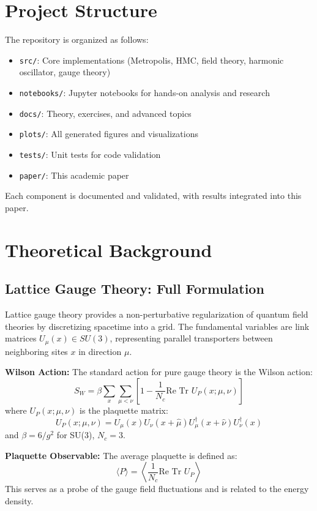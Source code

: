 \documentclass[12pt]{article}
\begin{document}
\section{Project Structure}
The repository is organized as follows:
\begin{itemize}
    \item \texttt{src/}: Core implementations (Metropolis, HMC, field theory, harmonic oscillator, gauge theory)
    \item \texttt{notebooks/}: Jupyter notebooks for hands-on analysis and research
    \item \texttt{docs/}: Theory, exercises, and advanced topics
    \item \texttt{plots/}: All generated figures and visualizations
    \item \texttt{tests/}: Unit tests for code validation
    \item \texttt{paper/}: This academic paper
\end{itemize}
Each component is documented and validated, with results integrated into this paper.

\section{Theoretical Background}
\subsection{Lattice Gauge Theory: Full Formulation}
Lattice gauge theory provides a non-perturbative regularization of quantum field theories by discretizing spacetime into a grid. The fundamental variables are link matrices $U_\mu(x) \in SU(3)$, representing parallel transporters between neighboring sites $x$ in direction $\mu$.

\textbf{Wilson Action:}
The standard action for pure gauge theory is the Wilson action:
\begin{equation}
S_W = \beta \sum_{x} \sum_{\mu < \nu} \left[1 - \frac{1}{N_c} \text{Re Tr } U_P(x; \mu, \nu)\right]
\end{equation}
where $U_P(x; \mu, \nu)$ is the plaquette matrix:
\begin{equation}
U_P(x; \mu, \nu) = U_\mu(x) U_\nu(x+\hat{\mu}) U_\mu^\dagger(x+\hat{\nu}) U_\nu^\dagger(x)
\end{equation}
and $\beta = 6/g^2$ for SU(3), $N_c = 3$.

\textbf{Plaquette Observable:}
The average plaquette is defined as:
\begin{equation}
\langle P \rangle = \left\langle \frac{1}{N_c} \text{Re Tr } U_P \right\rangle
\end{equation}
This serves as a probe of the gauge field fluctuations and is related to the energy density.
\end{document}
